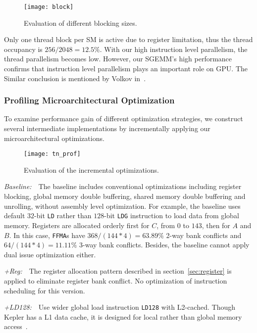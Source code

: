 \begin{figure}[htbp]
\begin{center}
\texttt{[image: block]}
    \caption{Evaluation of different blocking sizes.} %
\label{fig:block}
\end{center}
\end{figure}

Only one thread block per SM is active due to register limitation, thus the thread occupancy is $256/2048=12.5\%$.
With our high instruction level parallelism, the thread parallelism becomes low.
However, our SGEMM's high performance confirms that instruction level parallelism plays an important role on GPU.
The Similar conclusion is mentioned by Volkov in~\cite{volkov2010better}.

\subsubsection{Profiling Microarchitectural Optimization}

To examine performance gain of different optimization strategies, we construct several intermediate 
implementations by incrementally applying our microarchitectural optimizations.
\begin{figure}[htbp]
\begin{center}
\texttt{[image: tn\_prof]}
    \caption{Evaluation of the incremental optimizations.}
\label{fig:th_prof}
\end{center}
\end{figure}

{\it Baseline:}~~The baseline includes conventional optimizations including register blocking, global
memory double buffering, shared memory double buffering and unrolling, without assembly level optimization.
For example, the baseline uses default $32$-bit {\tt LD} rather than $128$-bit {\tt LDG} instruction to load data from global memory.
Registers are allocated orderly first for $C$, from $0$ to $143$, then for $A$ and $B$. 
In this case, {\tt FFMA}s have $368/(144*4)=63.89\%$ 2-way bank conflicts and $64/(144*4)=11.11\%$ 3-way bank conflicts. 
Besides, the baseline cannot apply dual issue optimization either.

{\it +Reg:}~~The register allocation pattern described in section~\ref{sec:register} is applied to eliminate register bank conflict. 
No optimization of instruction scheduling for this version.

{\it +LD128:}~~Use wider global load instruction {\tt LD128} with L2-cached.
Though Kepler has a L1 data cache, it is designed for local rather than global memory access~\cite{gk110}.

